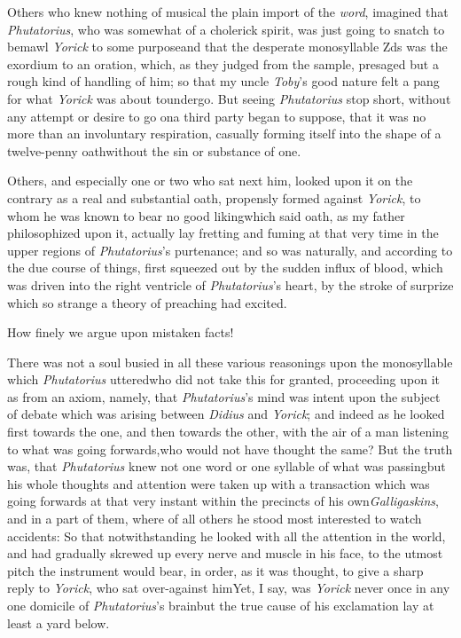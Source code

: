 \documentclass{article}
\begin{document}
Others who knew nothing of musical\break 
{}
the plain import of the \textit{word}, imagined that
\textit{Phutatorius}, who was somewhat of a cholerick spirit, was
just going to snatch  to bemawl \textit{Yorick} to some purpose\tsk and
that the desperate monosyllable Z\tsh ds was the exordium
to an oration, which, as they judged from the sample, presaged but
a rough kind of handling of him;\break 
so that my uncle \textit{Toby}’s good nature felt\break
a pang for what \textit{Yorick} was about to\break undergo. But seeing \textit{Phutatorius} stop short,
without any attempt or desire to go on\tsk a third party began to
suppose,\pb
that it was no more than an involuntary respiration,
casually forming itself into the shape of a twelve-penny
oath\tsk without the sin or substance of one.

Others, and especially one or two who sat next him, looked
upon it on the contrary as a real and substantial oath,
pro\-pensly formed against \textit{Yorick}, to whom he was
known to bear no good liking\tsk\break which said oath, as my
father philosophized upon it, actually lay fretting and
fuming at that very time in the upper regions of
\textit{Phutatorius}’s purtenance; and so was naturally, and
according to the due course of things, first squeezed out by
the sudden influx of blood, which was driven into the right
ventricle of \textit{Phutatorius}’s heart, by the stroke of
surprize which so strange a theory of preaching had excited.

\newpage
How finely we argue upon mistaken facts!

There was not a soul busied in all these various reasonings upon
the monosyllable which \textit{Phutatorius} uttered\tsk who did not
take this for granted, proceeding upon it as from an axiom, namely,
that \textit{Phutatorius}’s mind was intent upon the subject of debate which was arising between
\textit{Didius} and \textit{Yorick}; and indeed as he looked first
towards the one, and then towards the other, with the air of a man
listening to what was going forwards,\tsk who would not have
thought the same? But the truth was, that \textit{Phutatorius} knew
not one word or one syllable of what was passing\tsk but his
whole thoughts and attention were taken up with a transaction which
was going forwards at that very instant within the precincts of his
own\pb \textit{Galligaskins}, and in a part of them, where of all others
he stood most interested to watch accidents: So that
notwithstanding he looked with all the attention in the world, and
had gradually skrewed up every nerve and muscle in his face, to the
utmost pitch the instrument would bear, in order, as it was
thought, to give a sharp reply to \textit{Yorick}, who sat
over-against him\tsk Yet, I say, was \textit{Yorick} never
once in any one domicile of \textit{Phutatorius}’s
brain\tsk but the true cause of his exclamation lay at
least a yard below.
\end{document}
